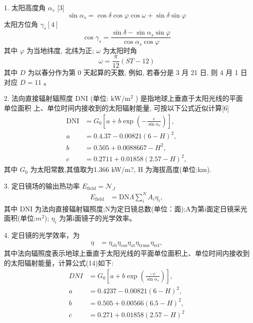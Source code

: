 \documentclass{article}
\begin{document}
1. 太阳高度角 \(\alpha_{s}\) [3] 
\[\sin \alpha_s=\cos \delta \cos \varphi \cos \omega+\sin \delta \sin \varphi\]
太阳方位角 \(\gamma_{s}[4]\)
\[\cos \gamma_{s}=\frac{\sin \delta-\sin \alpha_{s} \sin \varphi}{\cos \alpha_{s} \cos \varphi}\]
其中 \(\varphi\) 为当地纬度, 北纬为正; \(\omega\) 为太阳时角
\[\omega=\frac{\pi}{12}(S T-12)\]
其中 \(D\) 为以春分作为第 0 天起算的天数, 例如, 若春分是 3 月 21 日, 则 4 月 1 日对应 \(D=11\) 。

2. 法向直接辐射辐照度 DNI (单位: \(\mathrm{kW} / \mathrm{m}^{2}\) ) 是指地球上垂直于太阳光线的平面单位面积
上、单位时间内接收到的太阳辐射能量, 可按以下公式近似计算[6]
\begin{align}
\mathrm{DNI} &= G_{0}\left[a + b \exp\left(-\frac{c}{\sin\alpha_{e}}\right)\right],\\ 
a &= 0.4.37 - 0.00821(6-H)^{2},\\ 
b &= 0.505 + 0.0088667-H^{2},\\ 
c &= 0.2711 + 0.01858(2.57-H)^{2},
\end{align}
其中 $G_{\mathrm{0}}$ 为太阳常数,其值取为1.366 kW/m?, H 为海拔高度(单位:km).

3. 定日镜场的输出热功率
$E_{\mathrm{field}} = \mathcal{N}_{J}$ 
\begin{align}
    E_{\mathrm{field}} &= \mathrm{DN}\Lambda\sum_{i}^{N}A_{i}\eta_{i},
\end{align}
其中 DNI 为法向直接辐射辐照度;N为定日镜总数(单位：面);A为第i面定日镜采光面积(单位:$m^{2}$);
$\eta_{i}$ 为第i面镜子的光学效率。

4. 定日镜的光学效率，为
\begin{align}
    \eta &= \eta_{s\mathrm{b}}\eta_{\mathrm{cos}}\eta_{\mathrm{at}}\eta_{\mathrm{trunc}}\eta_{\mathrm{ref}},
\end{align}
其中法向辐照度表示地球上垂直于太阳光线的平面单位面积上、单位时间内接收到的太阳辐射能量，计算公式(14)如下:
\begin{align}
    D N I &= G_{0}\left[a + b \exp\left(\frac{-c}{\sin \alpha_{s}}\right)\right], \\
    a &= 0.4237 - 0.00821(6 - H)^{2}, \\
    b &= 0.505 + 0.00566(6.5 - H)^{2}, \\
    c &= 0.271 + 0.01858(2.57 - H)^{2}
\end{align}
\end{document}
